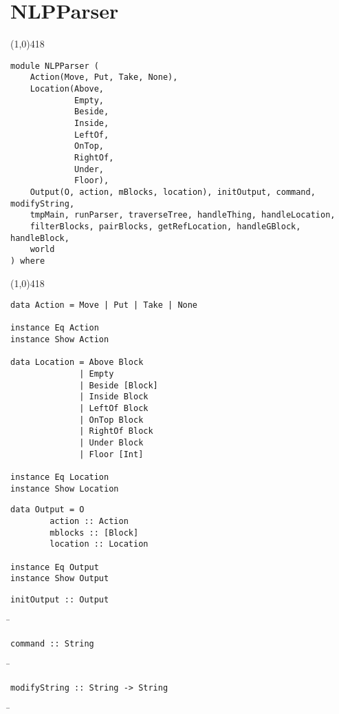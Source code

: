 \section{NLPParser}
\begin{center}
\line(1,0){418}
\end{center}
\begin{verbatim}
module NLPParser (
    Action(Move, Put, Take, None),
    Location(Above,
             Empty,
             Beside,
             Inside,
             LeftOf,
             OnTop,
             RightOf,
             Under,
             Floor),
    Output(O, action, mBlocks, location), initOutput, command, modifyString,
    tmpMain, runParser, traverseTree, handleThing, handleLocation,
    filterBlocks, pairBlocks, getRefLocation, handleGBlock, handleBlock,
    world
) where
\end{verbatim}
\begin{center}
\line(1,0){418}
\end{center}
\begin{verbatim}
data Action = Move | Put | Take | None

instance Eq Action
instance Show Action

data Location = Above Block
              | Empty
              | Beside [Block]
              | Inside Block
              | LeftOf Block
              | OnTop Block
              | RightOf Block
              | Under Block
              | Floor [Int]

instance Eq Location
instance Show Location
\end{verbatim}
\newpage
\begin{verbatim}
data Output = O 
        action :: Action
        mblocks :: [Block]
        location :: Location

instance Eq Output
instance Show Output
\end{verbatim}
\begin{verbatim}
initOutput :: Output
\end{verbatim}
\begin{tabbing}
\hspace*{1cm}\= \kill
\> 
\end{tabbing}
\begin{verbatim}
command :: String
\end{verbatim}
\begin{tabbing}
\hspace*{1cm}\= \kill
\> 
\end{tabbing}
\begin{verbatim}
modifyString :: String -> String
\end{verbatim}
\begin{tabbing}
\hspace*{1cm}\= \kill
\> 
\end{tabbing}

